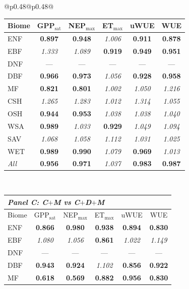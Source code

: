\begin{table}[htbp]
\begin{tabular}{@{}p{0.48\linewidth}@{\hspace{0.04\linewidth}}p{0.48\linewidth}@{}}
\begin{tabular}{lccccc}
\midrule
Biome & GPP$_\mathrm{sat}$ & NEP$_\mathrm{max}$ & ET$_\mathrm{max}$ & uWUE & WUE \\
\midrule
ENF & \textbf{0.897} & \textbf{0.948} & \textit{1.006} & \textbf{0.911} & \textbf{0.878} \\
EBF & \textit{1.333} & \textit{1.089} & \textbf{0.919} & \textbf{0.949} & \textbf{0.951} \\
DNF & --- & --- & --- & --- & --- \\
DBF & \textbf{0.966} & \textbf{0.973} & \textit{1.056} & \textbf{0.928} & \textbf{0.958} \\
MF & \textbf{0.821} & \textbf{0.801} & \textit{1.002} & \textit{1.050} & \textit{1.216} \\
CSH & \textit{1.265} & \textit{1.283} & \textit{1.012} & \textit{1.314} & \textit{1.055} \\
OSH & \textbf{0.944} & \textbf{0.953} & \textit{1.038} & \textit{1.038} & \textit{1.040} \\
WSA & \textbf{0.989} & \textit{1.033} & \textbf{0.929} & \textit{1.049} & \textit{1.094} \\
SAV & \textit{1.068} & \textit{1.058} & \textit{1.112} & \textit{1.031} & \textit{1.025} \\
WET & \textbf{0.989} & \textbf{0.990} & \textit{1.079} & \textbf{0.969} & \textit{1.013} \\
\midrule
\textit{All} & \textbf{0.956} & \textbf{0.971} & \textit{1.037} & \textbf{0.983} & \textbf{0.987} \\
\bottomrule
\end{tabular} \\[1.4em]
\footnotesize
\setlength{\tabcolsep}{3.5pt}
\renewcommand{\arraystretch}{1.06}
\begin{tabular}{lccccc}
\toprule
\multicolumn{6}{l}{\textit{Panel C: C$+$M vs C$+$D$+$M}} \\
\midrule
Biome & GPP$_\mathrm{sat}$ & NEP$_\mathrm{max}$ & ET$_\mathrm{max}$ & uWUE & WUE \\
\midrule
ENF & \textbf{0.866} & \textbf{0.980} & \textbf{0.938} & \textbf{0.894} & \textbf{0.830} \\
EBF & \textit{1.080} & \textit{1.056} & \textbf{0.861} & \textit{1.022} & \textit{1.149} \\
DNF & --- & --- & --- & --- & --- \\
DBF & \textbf{0.943} & \textbf{0.924} & \textit{1.102} & \textbf{0.856} & \textbf{0.922} \\
MF & \textbf{0.618} & \textbf{0.569} & \textbf{0.882} & \textbf{0.956} & \textbf{0.830} \\

\end{tabular}
\end{tabular}
\end{table}
